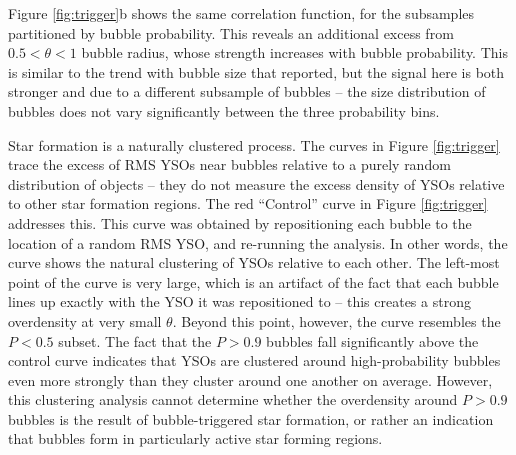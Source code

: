 Figure \ref{fig:trigger}b shows the same correlation function, for the subsamples partitioned by bubble probability. This reveals an additional excess from $0.5 < \theta < 1$ bubble radius, whose strength increases with bubble probability. This is similar to the trend with bubble size that \cite{Kendrew12} reported, but the signal here is both stronger and due to a different subsample of bubbles -- the size distribution of bubbles does not vary significantly between the three probability bins.

Star formation is a naturally clustered process. The curves in Figure \ref{fig:trigger} trace the excess of RMS YSOs near bubbles relative to a purely random distribution of objects -- they do not measure the excess density of YSOs relative to other star formation regions. The red ``Control'' curve in Figure \ref{fig:trigger} addresses this. This curve was obtained by repositioning each bubble to the location of a random RMS YSO, and re-running the analysis. In other words, the curve shows the natural clustering of YSOs relative to each other. The left-most point of the curve is very large, which is an artifact of the fact that each bubble lines up exactly with the YSO it was repositioned to -- this creates a strong overdensity at very small $\theta$. Beyond this point, however, the curve resembles the $P < 0.5$ subset. The fact that the $P > 0.9$ bubbles fall significantly above the control curve indicates that YSOs are clustered around high-probability bubbles even more strongly than they cluster around one another on average. However, this clustering analysis cannot determine whether the overdensity around $P > 0.9$ bubbles is the result of bubble-triggered star formation, or rather an indication that bubbles form in particularly active star forming regions.

